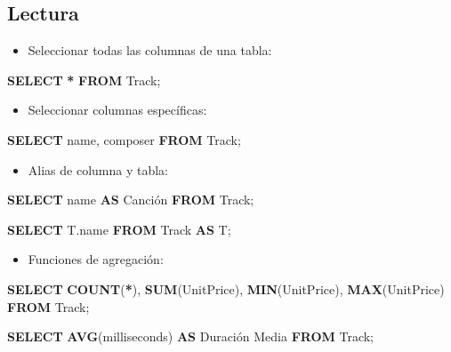 \documentclass[
]{book}
\newenvironment{Shaded}{\begin{snugshade}}{\end{snugshade}}
\newcommand{\FunctionTok}[1]{\textcolor[rgb]{0.13,0.29,0.53}{\textbf{#1}}}
\newcommand{\KeywordTok}[1]{\textcolor[rgb]{0.13,0.29,0.53}{\textbf{#1}}}
\newcommand{\NormalTok}[1]{#1}
\newcommand{\OperatorTok}[1]{\textcolor[rgb]{0.81,0.36,0.00}{\textbf{#1}}}
\newcommand{\StringTok}[1]{\textcolor[rgb]{0.31,0.60,0.02}{#1}}
\providecommand{\tightlist}{%
  \setlength{\itemsep}{0pt}\setlength{\parskip}{0pt}}
\begin{document}
\subsection{Lectura}\label{lectura}

\begin{itemize}
\tightlist
\item
  Seleccionar todas las columnas de una tabla:
\end{itemize}

\begin{Shaded}
\begin{Highlighting}[]
  \KeywordTok{SELECT} \OperatorTok{*} \KeywordTok{FROM}\NormalTok{ Track;  }
\end{Highlighting}
\end{Shaded}

\begin{itemize}
\tightlist
\item
  Seleccionar columnas específicas:
\end{itemize}

\begin{Shaded}
\begin{Highlighting}[]
  \KeywordTok{SELECT}\NormalTok{ name, composer }\KeywordTok{FROM}\NormalTok{ Track; }
\end{Highlighting}
\end{Shaded}

\begin{itemize}
\tightlist
\item
  Alias de columna y tabla:
\end{itemize}

\begin{Shaded}
\begin{Highlighting}[]
  \KeywordTok{SELECT}\NormalTok{ name }\KeywordTok{AS}\NormalTok{ Canción }\KeywordTok{FROM}\NormalTok{ Track; }

  \KeywordTok{SELECT}\NormalTok{ T.name }\KeywordTok{FROM}\NormalTok{ Track }\KeywordTok{AS}\NormalTok{ T;}
\end{Highlighting}
\end{Shaded}

\begin{itemize}
\tightlist
\item
  Funciones de agregación:
\end{itemize}

\begin{Shaded}
\begin{Highlighting}[]
  \KeywordTok{SELECT} \FunctionTok{COUNT}\NormalTok{(}\OperatorTok{*}\NormalTok{), }\FunctionTok{SUM}\NormalTok{(UnitPrice), }\FunctionTok{MIN}\NormalTok{(UnitPrice), }\FunctionTok{MAX}\NormalTok{(UnitPrice) }\KeywordTok{FROM}\NormalTok{ Track; }

  \KeywordTok{SELECT} \FunctionTok{AVG}\NormalTok{(milliseconds) }\KeywordTok{AS} \StringTok{\textquotesingle{}Duración Media\textquotesingle{}} \KeywordTok{FROM}\NormalTok{ Track; }
\end{Highlighting}
\end{Shaded}
\end{document}
